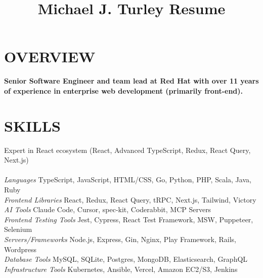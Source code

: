 \documentclass[line,margin]{res}
\begin{document}
\title{Michael J. Turley Resume}

\address{mike@miketurley.com | (781) 264-6283 | Hudson, MA 01749}
\address{\href{https://github.com/mturley}{github.com/mturley}
    | \href{https://www.linkedin.com/in/mturley/}{linkedin.com/in/mturley}}

\begin{resume}

\section{OVERVIEW}
    {\large \textbf{Senior Software Engineer and team lead at Red Hat with over 11 years of experience in enterprise web development (primarily front-end).}}

\section{SKILLS}
    Expert in React ecosystem (React, Advanced TypeScript, Redux, React Query, Next.js) \\
    \vspace{-.5\baselineskip}
    \\
    {\sl Languages} \hfill TypeScript, JavaScript, HTML/CSS, Go, Python, PHP, Scala, Java, Ruby \\
    {\sl Frontend Libraries} \hfill React, Redux, React Query, tRPC, Next.js, Tailwind, Victory \\
    {\sl AI Tools} \hfill Claude Code, Cursor, spec-kit, Coderabbit, MCP Servers \\
    {\sl Frontend Testing Tools} \hfill Jest, Cypress, React Test Framework, MSW, Puppeteer, Selenium \\
    {\sl Servers/Frameworks} \hfill Node.js, Express, Gin, Nginx, Play Framework, Rails, Wordpress \\
    {\sl Database Tools} \hfill MySQL, SQLite, Postgres, MongoDB, Elasticsearch, GraphQL \\
    {\sl Infrastructure Tools} \hfill Kubernetes, Ansible, Vercel, Amazon EC2/S3, Jenkins


\end{resume}
\end{document}
